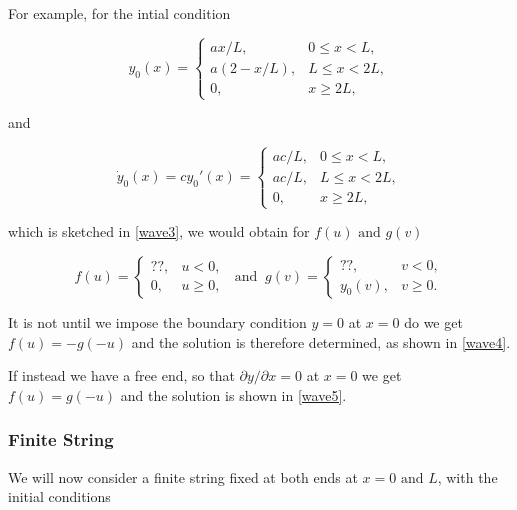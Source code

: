 \documentclass[a4paper,12pt]{report}
\begin{document}
For example, for the intial condition 

\begin{equation}
	y_0(x) =
\begin{cases}
    ax /L,& 0 \leq x < L, \\
    a\left(2 - x/L\right),& L \leq x < 2L, \\
    0,&x \geq 2L,
\end{cases}
\end{equation}

and

\begin{equation}
	\dot{y}_0(x) = c y_0'(x) =
\begin{cases}
    ac /L,& 0 \leq x < L, \\
    ac /L,& L \leq x < 2L, \\
    0,& x \geq 2L,
\end{cases}
\end{equation}

which is sketched in \cref{wave3}, we would obtain for \(f(u) \text { and }  g(v)\) 

\begin{equation}
	f(u) = \begin{cases}
		??,& u<0,\\
		0,& u \ge 0,
	\end{cases} ~\text { and }~ g(v) = \begin{cases}
		??,& v<0,\\
		y_0 (v),& v \ge 0.
	\end{cases}
\end{equation}


It is not until we impose the boundary condition \(y= 0 \) at \(x=0\) do we get \(f(u) = -g(-u)\) and the solution is therefore determined, as shown in \cref{wave4}.


If instead we have a free end, so that \(\partial y /\partial x = 0\) at \(x = 0\) we get \(f(u) = g(-u)\) and the solution is shown in \cref{wave5}.   


\subsubsection{Finite String}

We will now consider a finite string fixed at both ends at \(x= 0 \text { and } L\), with the initial conditions
\end{document}
